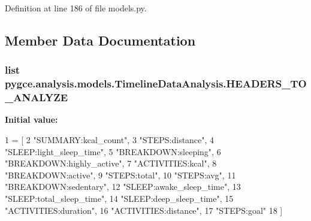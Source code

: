 Definition at line 186 of file models.\+py.



\subsection{Member Data Documentation}
\subsubsection[{\texorpdfstring{H\+E\+A\+D\+E\+R\+S\+\_\+\+T\+O\+\_\+\+A\+N\+A\+L\+Y\+ZE}{HEADERS_TO_ANALYZE}}]{\setlength{\rightskip}{0pt plus 5cm}list pygce.\+analysis.\+models.\+Timeline\+Data\+Analysis.\+H\+E\+A\+D\+E\+R\+S\+\_\+\+T\+O\+\_\+\+A\+N\+A\+L\+Y\+ZE\hspace{0.3cm}{\ttfamily [static]}}\hypertarget{classpygce_1_1analysis_1_1models_1_1_timeline_data_analysis_abc835b2b9b9d8555a2b49e8534782021}{}\label{classpygce_1_1analysis_1_1models_1_1_timeline_data_analysis_abc835b2b9b9d8555a2b49e8534782021}
{\bfseries Initial value\+:}
\begin{DoxyCode}
1 = [
2         \textcolor{stringliteral}{"SUMMARY:kcal\_count"},
3         \textcolor{stringliteral}{"STEPS:distance"},
4         \textcolor{stringliteral}{"SLEEP:light\_sleep\_time"},
5         \textcolor{stringliteral}{"BREAKDOWN:sleeping"},
6         \textcolor{stringliteral}{"BREAKDOWN:highly\_active"},
7         \textcolor{stringliteral}{"ACTIVITIES:kcal"},
8         \textcolor{stringliteral}{"BREAKDOWN:active"},
9         \textcolor{stringliteral}{"STEPS:total"},
10         \textcolor{stringliteral}{"STEPS:avg"},
11         \textcolor{stringliteral}{"BREAKDOWN:sedentary"},
12         \textcolor{stringliteral}{"SLEEP:awake\_sleep\_time"},
13         \textcolor{stringliteral}{"SLEEP:total\_sleep\_time"},
14         \textcolor{stringliteral}{"SLEEP:deep\_sleep\_time"},
15         \textcolor{stringliteral}{"ACTIVITIES:duration"},
16         \textcolor{stringliteral}{"ACTIVITIES:distance"},
17         \textcolor{stringliteral}{"STEPS:goal"}
18     ]
\end{DoxyCode}


